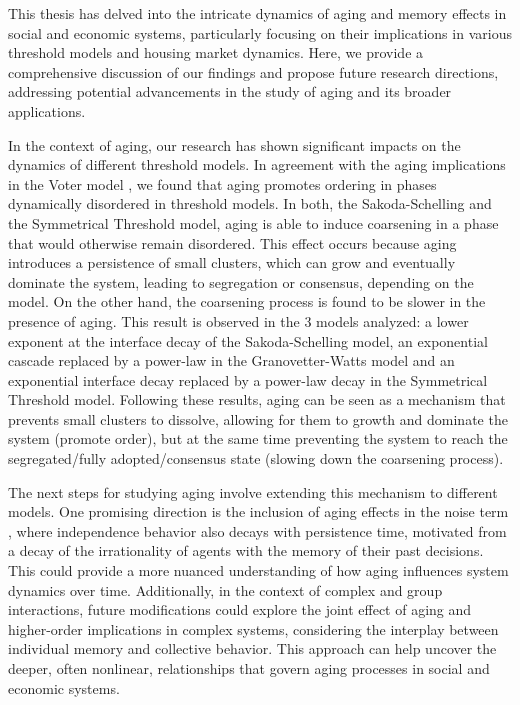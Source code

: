 This thesis has delved into the intricate dynamics of aging and memory effects in social and economic systems, particularly focusing on their implications in various threshold models and housing market dynamics. Here, we provide a comprehensive discussion of our findings and propose future research directions, addressing potential advancements in the study of aging and its broader applications.

In the context of aging, our research has shown significant impacts on the dynamics of different threshold models. In agreement with the aging implications in the Voter model \cite{}, we found that aging promotes ordering in phases dynamically disordered in threshold models. In both, the Sakoda-Schelling and the Symmetrical Threshold model, aging is able to induce coarsening in a phase that would otherwise remain disordered. This effect occurs because aging introduces a persistence of small clusters, which can grow and eventually dominate the system, leading to segregation or consensus, depending on the model. On the other hand, the coarsening process is found to be slower in the presence of aging. This result is observed in the 3 models analyzed: a lower exponent at the interface decay of the Sakoda-Schelling model, an exponential cascade replaced by a power-law in the Granovetter-Watts model and an exponential interface decay replaced by a power-law decay in the Symmetrical Threshold model. Following these results, aging can be seen as a mechanism that prevents small clusters to dissolve, allowing for them to growth and dominate the system (promote order), but at the same time preventing the system to reach the segregated/fully adopted/consensus state (slowing down the coarsening process). 

The next steps for studying aging involve extending this mechanism to different models. One promising direction is the inclusion of aging effects in the noise term \cite{vieira2023noisy,llabres2024aging}, where independence behavior also decays with persistence time, motivated from a decay of the irrationality of agents with the memory of their past decisions. This could provide a more nuanced understanding of how aging influences system dynamics over time. Additionally, in the context of complex and group interactions, future modifications could explore the joint effect of aging and higher-order implications in complex systems, considering the interplay between individual memory and collective behavior. This approach can help uncover the deeper, often nonlinear, relationships that govern aging processes in social and economic systems. 

